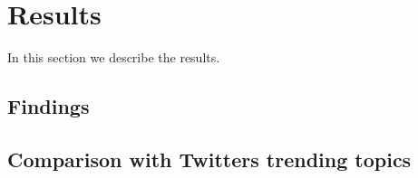 \section{Results}\label{results}
In this section we describe the results.

\subsection{Findings}\label{findings-result}
\subsection{Comparison with Twitters trending topics}\label{twitter-result}